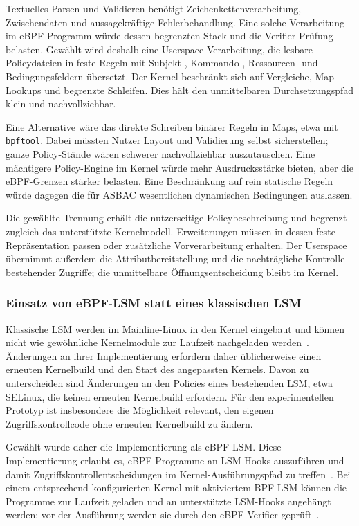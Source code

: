 Textuelles Parsen und Validieren benötigt Zeichenkettenverarbeitung, Zwischendaten und aussagekräftige Fehlerbehandlung. Eine solche Verarbeitung im eBPF-Programm würde dessen begrenzten Stack und die Verifier-Prüfung belasten. Gewählt wird deshalb eine Userspace-Verarbeitung, die lesbare Policydateien in feste Regeln mit Subjekt-, Kommando-, Ressourcen- und Bedingungsfeldern übersetzt. Der Kernel beschränkt sich auf Vergleiche, Map-Lookups und begrenzte Schleifen. Dies hält den unmittelbaren Durchsetzungspfad klein und nachvollziehbar.

Eine Alternative wäre das direkte Schreiben binärer Regeln in Maps, etwa mit \texttt{bpftool}. Dabei müssten Nutzer Layout und Validierung selbst sicherstellen; ganze Policy-Stände wären schwerer nachvollziehbar auszutauschen. Eine mächtigere Policy-Engine im Kernel würde mehr Ausdrucksstärke bieten, aber die eBPF-Grenzen stärker belasten. Eine Beschränkung auf rein statische Regeln würde dagegen die für ASBAC wesentlichen dynamischen Bedingungen auslassen.

Die gewählte Trennung erhält die nutzerseitige Policybeschreibung und begrenzt zugleich das unterstützte Kernelmodell. Erweiterungen müssen in dessen feste Repräsentation passen oder zusätzliche Vorverarbeitung erhalten. Der Userspace übernimmt außerdem die Attributbereitstellung und die nachträgliche Kontrolle bestehender Zugriffe; die unmittelbare Öffnungsentscheidung bleibt im Kernel.

\subsubsection{Einsatz von eBPF-LSM statt eines klassischen LSM}
Klassische LSM werden im Mainline-Linux in den Kernel eingebaut und können nicht wie gewöhnliche Kernelmodule zur Laufzeit nachgeladen werden~\cite{kernelorgLSM}.
Änderungen an ihrer Implementierung erfordern daher üblicherweise einen erneuten Kernelbuild und den Start des angepassten Kernels.
Davon zu unterscheiden sind Änderungen an den Policies eines bestehenden LSM, etwa SELinux, die keinen erneuten Kernelbuild erfordern.
Für den experimentellen Prototyp ist insbesondere die Möglichkeit relevant, den eigenen Zugriffskontrollcode ohne erneuten Kernelbuild zu ändern.

Gewählt wurde daher die Implementierung als eBPF-LSM.
Diese Implementierung erlaubt es, eBPF-Programme an LSM-Hooks auszuführen und damit Zugriffskontrollentscheidungen im Kernel-Ausführungspfad zu treffen~\cite{kernelBpfLsm}.
Bei einem entsprechend konfigurierten Kernel mit aktiviertem BPF-LSM können die Programme zur Laufzeit geladen und an unterstützte LSM-Hooks angehängt werden; vor der Ausführung werden sie durch den eBPF-Verifier geprüft~\cite{kernelBpfLsm,kernelBpfVerifier}.

